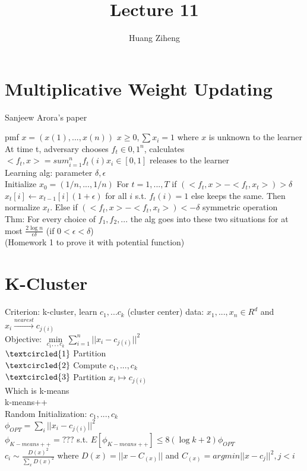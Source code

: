 \documentclass{article}
\author{Huang Ziheng}
\title{Lecture 11}
\begin{document}
\maketitle
\section{Multiplicative Weight Updating}
Sanjeew Arora's paper

pmf $x=(x(1),...,x(n))$ $x\geq0,\sum x_i=1$ where $x$ is unknown to the learner\\
At time t, adversary chooses $f_t\in{0,1}^n$, calculates $<f_t,x>=sum_{i=1}^nf_t(i)x_i \in [0,1]$ releases to the learner\\
Learning alg: parameter $\delta,\epsilon$\\
Initialize $x_0=(1/n,...,1/n)$ For $t=1,...,T$ if $(<f_t,x>-<f_t,x_t>)>\delta$\\
${x_t[i]\leftarrow x_{t-1}[i]}(1+\epsilon)$ for all $i$ s.t. $f_t(i)=1$ else keeps the same. Then normalize $x_t$. Else if $(<f_t,x>-<f_t,x_t>)<-\delta$ symmetric operation\\
Thm: For every choice of $f_1,f_2,...$ the alg goes into these two situations for at most $\frac{2\log{n}}{\epsilon\delta}$ (if $0<\epsilon<\delta$)\\
(Homework 1 to prove it with potential function)\\
\section{K-Cluster}
Criterion: k-cluster, learn $c_1,...c_k$ (cluster center) data: $x_1,...,x_n\in R^d$ and $x_i\xrightarrow{nearest} c_{j(i)}$\\
Objective: $\min\limits_{c_1,,,c_k} \sum_{i=1}^n||x_i-c_{j(i)}||^2$\\
$\textcircled{1}$ Partition\\
$\textcircled{2}$ Compute $c_1,...,c_k$\\
$\textcircled{3}$ Partition $x_i\mapsto c_{j(i)}$\\
Which is k-means\\
k-means++\\
Random Initialization: $c_1,...,c_k$\\
$\phi_{OPT}=\sum_i||x_i-c_{j(i)}||^2$\\
$\phi_{K-means++}=???$ s.t. $E[\phi_{K-means++}]\leq 8(\log{k}+2)\phi_{OPT}$\\
$c_i\sim \frac{D(x)^2}{\sum_{x}D(x)^2}$ where $D(x)=||x-C_{(x)}||$ and $C_{(x)}=argmin{||x-c_j||^2,j<i}$
\end{document}
